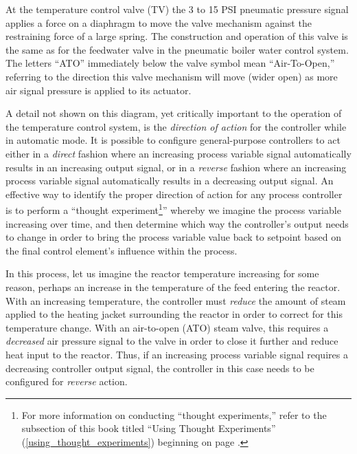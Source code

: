 At the temperature control valve (TV) the 3 to 15 PSI pneumatic pressure signal applies a force on a diaphragm to move the valve mechanism against the restraining force of a large spring.  The construction and operation of this valve is the same as for the feedwater valve in the pneumatic boiler water control system.  The letters ``ATO'' immediately below the valve symbol mean ``Air-To-Open,'' referring to the direction this valve mechanism will move (wider open) as more air signal pressure is applied to its actuator.

\vskip 10pt

A detail not shown on this diagram, yet critically important to the operation of the temperature control system, is the \textit{direction of action} for the controller while in automatic mode.  It is possible to configure general-purpose controllers to act either in a \textit{direct} fashion where an increasing process variable signal automatically results in an increasing output signal, or in a \textit{reverse} fashion where an increasing process variable signal automatically results in a decreasing output signal.  An effective way to identify the proper direction of action for any process controller is to perform a ``thought experiment\footnote{For more information on conducting ``thought experiments,'' refer to the subsection of this book titled ``Using Thought Experiments'' (\ref{using_thought_experiments}) beginning on page \pageref{using_thought_experiments}.}'' whereby we imagine the process variable increasing over time, and then determine which way the controller's output needs to change in order to bring the process variable value back to setpoint based on the final control element's influence within the process.             

In this process, let us imagine the reactor temperature increasing for some reason, perhaps an increase in the temperature of the feed entering the reactor.  With an increasing temperature, the controller must \textit{reduce} the amount of steam applied to the heating jacket surrounding the reactor in order to correct for this temperature change.  With an air-to-open (ATO) steam valve, this requires a \textit{decreased} air pressure signal to the valve in order to close it further and reduce heat input to the reactor.  Thus, if an increasing process variable signal requires a decreasing controller output signal, the controller in this case needs to be configured for \textit{reverse} action.

